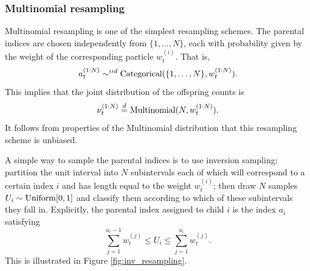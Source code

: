 \subsubsection{Multinomial resampling}
Multinomial resampling \parencite{rubin1987,gordon1993,efron1994} is one of the simplest resampling schemes.
The parental indices are chosen independently from $\{1, \dots, N\}$, each with probability given by the weight of the corresponding particle $w_t^{(i)}$. 
That is, 
\begin{equation*}
a_t^{(1:N)} \sim^{iid} \operatorname{Categorical}( \{1,\dots, N\}, w_t^{(1:N)} ) .
\end{equation*}
This implies that the joint distribution of the offspring counts is 
\begin{equation*}
\nu_t^{(1:N)} \overset{d}{=} \operatorname{Multinomial}(N, w_t^{(1:N)} ) .
\end{equation*}
It follows from properties of the Multinomial distribution that this resampling scheme is unbiased.

A simple way to sample the parental indices is to use inversion sampling: partition the unit interval into $N$ subintervals each of which will correspond to a certain index $i$ and has length equal to the weight $w_t^{(i)}$; then draw $N$ samples $U_i \sim \operatorname{Uniform}[0,1]$ and classify them according to which of these subintervals they fall in.
Explicitly, the parental index assigned to child $i$ is the index $a_i$ satisfying
\begin{equation}\label{eq:syst_strat_resampling}
\sum_{j=1}^{a_i -1} w_t^{(j)} \leq U_i \leq \sum_{j=1}^{a_i} w_t^{(j)} .
\end{equation}
This is illustrated in Figure \ref{fig:inv_resampling}. 


